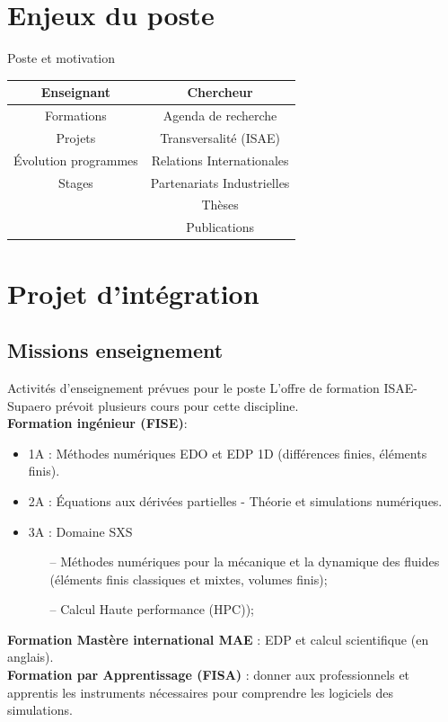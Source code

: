 \documentclass[aspectratio=169, french]{beamer}
\begin{document}
\section{Enjeux du poste}


\begin{frame}{Poste et motivation}
	\centering
	\begin{tcolorbox}[title = Missions, coltitle=white, halign=center, hbox]
		\begin{tabular}{c|c}
			\textbf{Enseignant}	& \textbf{Chercheur}  \\
			\hline
			Formations	& Agenda de recherche \\
			Projets	& Transversalité (ISAE)  \\
			Évolution programmes & Relations Internationales \\
			Stages & Partenariats Industrielles \\
			&  Thèses \\
			&  Publications \\
		\end{tabular}
	\end{tcolorbox}
\end{frame}


\section{Projet d'intégration}


\subsection{Missions enseignement}

\begin{frame}{Activités d'enseignement prévues pour le poste}
	L'offre de formation ISAE-Supaero prévoit plusieurs cours pour cette discipline.\\
	\vspace{.5cm}
	\textbf{Formation ingénieur (FISE)}:
	\begin{itemize}
		\item 1A : Méthodes numériques EDO et EDP 1D (différences finies, éléments finis).
		\item 2A : Équations aux dérivées partielles - Théorie et simulations numériques.
		\item 3A : Domaine SXS 
		\begin{itemize}
			\item[--] Méthodes numériques pour la mécanique et la dynamique des fluides (éléments finis classiques et mixtes, volumes finis);
			\item[--] Calcul Haute performance (HPC));
		\end{itemize}
	\end{itemize}
	\vspace{.5cm}
	\textbf{Formation Mastère international MAE} :  EDP et calcul scientifique (en anglais).\\
	\vspace{.5cm}
	\textbf{Formation par Apprentissage (FISA)} : donner aux professionnels et apprentis les instruments nécessaires pour comprendre les logiciels des simulations.
	
\end{frame}
\end{document}
